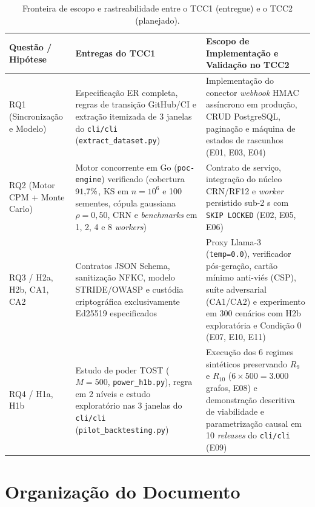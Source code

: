 \documentclass[12pt,openany,oneside,a4paper,english,brazilian,sumario=tradicional]{abntex2}
\newcommand{\fonteautores}{\par\vspace{1mm}{\small Fonte: Elaborado pelos autores (2026).}}
\begin{document}
\begin{table}[htbp]
\caption{Fronteira de escopo e rastreabilidade entre o TCC1 (entregue) e o TCC2 (planejado).}\label{tab:fronteira_tcc1_tcc2}
\footnotesize
\begin{tabularx}{\textwidth}{L{2.5cm} Y Y}
\toprule
\textbf{Questão / Hipótese} & \textbf{Entregas do TCC1} & \textbf{Escopo de Implementação e Validação no TCC2}\\
\midrule
RQ1 (Sincronização e Modelo) & Especificação ER completa, regras de transição GitHub/CI e extração itemizada de 3 janelas do \texttt{cli/\allowbreak cli} (\texttt{extract\_\allowbreak dataset.py}) & Implementação do conector \textit{webhook} HMAC assíncrono em produção, CRUD PostgreSQL, paginação e máquina de estados de rascunhos (E01, E03, E04)\\
RQ2 (Motor CPM + Monte Carlo) & Motor concorrente em Go (\texttt{poc-engine}) verificado (cobertura $91{,}7{}\%$, KS em $n=10^6$ e 100 sementes, cópula gaussiana $\rho=0{,}50$, CRN e \textit{benchmarks} em 1, 2, 4 e 8 \textit{workers}) & Contrato de serviço, integração do núcleo CRN/RF12 e \textit{worker} persistido sub-2 s com \texttt{SKIP LOCKED} (E02, E05, E06)\\
RQ3 / H2a, H2b, CA1, CA2 & Contratos JSON Schema, sanitização NFKC, modelo STRIDE/OWASP e custódia criptográfica exclusivamente Ed25519 especificados & Proxy Llama-3 (\texttt{temp=0.0}), verificador pós-geração, cartão mínimo anti-viés (CSP), suíte adversarial (CA1/CA2) e experimento em 300 cenários com H2b exploratória e Condição 0 (E07, E10, E11)\\
RQ4 / H1a, H1b & Estudo de poder TOST ($M=500$, \texttt{power\_\allowbreak h1b.py}), regra em 2 níveis e estudo exploratório nas 3 janelas do \texttt{cli/\allowbreak cli} (\texttt{pilot\_\allowbreak backtesting.py}) & Execução dos 6 regimes sintéticos preservando $R_9$ e $R_{10}$ ($6 \times 500 = 3.000$ grafos, E08) e demonstração descritiva de viabilidade e parametrização causal em 10 \textit{releases} do \texttt{cli/\allowbreak cli} (E09)\\
\bottomrule
\end{tabularx}
\fonteautores
\end{table}

\section{Organização do Documento}
\end{document}

